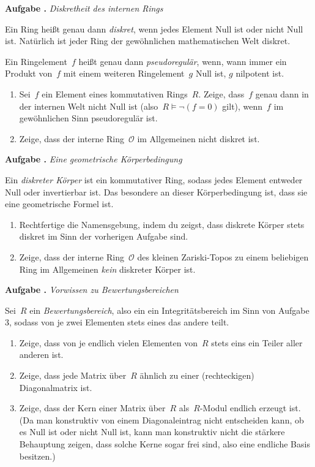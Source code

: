 \documentclass[a4paper,ngerman,12pt]{scrartcl}
\theoremstyle{definition}
\theoremstyle{plain}
\theoremstyle{remark}
\renewcommand{\O}{\mathcal{O}}
\renewcommand{\_}{\mathpunct{.}\,}
\newcommand{\?}{\,{:}\,}
\newlength{\aufgabenskip}
\newcounter{aufgabennummer}
\newenvironment{aufgabe}[1]{
  \addtocounter{aufgabennummer}{1}
  \textbf{Aufgabe \theaufgabennummer{}.} \emph{#1} \par
}{\vspace{\aufgabenskip}}
\begin{document}
\begin{aufgabe}{Diskretheit des internen Rings}
Ein Ring heißt genau dann \emph{diskret}, wenn jedes Element Null ist oder
nicht Null ist. Natürlich ist jeder Ring der gewöhnlichen mathematischen Welt
diskret.

Ein Ringelement~$f$ heißt genau dann \emph{pseudoregulär}, wenn,
wann immer ein Produkt von~$f$ mit einem weiteren Ringelement~$g$ Null ist, $g$
nilpotent ist.
\begin{enumerate}
\item Sei~$f$ ein Element eines kommutativen Rings~$R$. Zeige, dass~$f$ genau
dann in der internen Welt nicht Null ist (also~$R \models \neg(f = 0)$ gilt),
wenn~$f$ im gewöhnlichen Sinn pseudoregulär ist.
\item Zeige, dass der interne Ring~$\O$ im Allgemeinen nicht diskret ist.
\end{enumerate}
\end{aufgabe}

\begin{aufgabe}{Eine geometrische Körperbedingung}
Ein \emph{diskreter Körper} ist ein kommutativer Ring, sodass jedes Element
entweder Null oder invertierbar ist. Das besondere an dieser Körperbedingung
ist, dass sie eine geometrische Formel ist.
\begin{enumerate}
\item Rechtfertige die Namensgebung, indem du zeigst, dass diskrete Körper
stets diskret im Sinn der vorherigen Aufgabe sind.
\item Zeige, dass der
interne Ring~$\O$ des kleinen Zariski-Topos zu einem beliebigen Ring im
Allgemeinen \emph{kein} diskreter Körper ist.
\end{enumerate}
\end{aufgabe}

\begin{aufgabe}{Vorwissen zu Bewertungsbereichen}
Sei~$R$ ein \emph{Bewertungsbereich}, also ein
ein Integritätsbereich im Sinn von Aufgabe 3, sodass von je zwei Elementen
stets eines das andere teilt.
\begin{enumerate}
\item Zeige, dass von je endlich vielen Elementen von~$R$ stets
eins ein Teiler aller anderen ist.
\item Zeige, dass jede Matrix über~$R$ ähnlich zu einer
(rechteckigen) Diagonalmatrix ist.
\item Zeige, dass der Kern einer Matrix über~$R$ als~$R$-Modul endlich erzeugt ist.
(Da man konstruktiv von einem Diagonaleintrag nicht entscheiden kann, ob es
Null ist oder nicht Null ist, kann man konstruktiv nicht die stärkere
Behauptung zeigen, dass solche Kerne sogar frei sind, also eine endliche Basis
besitzen.)
\end{enumerate}
\end{aufgabe}
\end{document}
